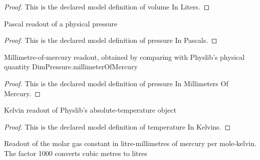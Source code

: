 \begin{proof}
  This is the declared model definition of volume In Liters.
\end{proof}
\begin{definition}
  \label{def:physics:phyx-mini-0336:phyxminiproblems-problemphyxmini0336-pressureinpascals}
  Pascal readout of a physical pressure
\end{definition}
\begin{proof}
  This is the declared model definition of pressure In Pascals.
\end{proof}
\begin{definition}
  \label{def:physics:phyx-mini-0336:phyxminiproblems-problemphyxmini0336-pressureinmillimetersofmercury}
  Millimetre-of-mercury readout, obtained by comparing with Physlib's physical quantity DimPressure.millimeterOfMercury
\end{definition}
\begin{proof}
  This is the declared model definition of pressure In Millimeters Of Mercury.
\end{proof}
\begin{definition}
  \label{def:physics:phyx-mini-0336:phyxminiproblems-problemphyxmini0336-temperatureinkelvins}
  Kelvin readout of Physlib's absolute-temperature object
\end{definition}
\begin{proof}
  This is the declared model definition of temperature In Kelvins.
\end{proof}
\begin{definition}
  \label{def:physics:phyx-mini-0336:phyxminiproblems-problemphyxmini0336-molargasconstantinlitermillimetersofmercurypermolekelvin}
  Readout of the molar gas constant in litre-millimetres of mercury per mole-kelvin. The factor 1000 converts cubic metres to litres
\end{definition}
